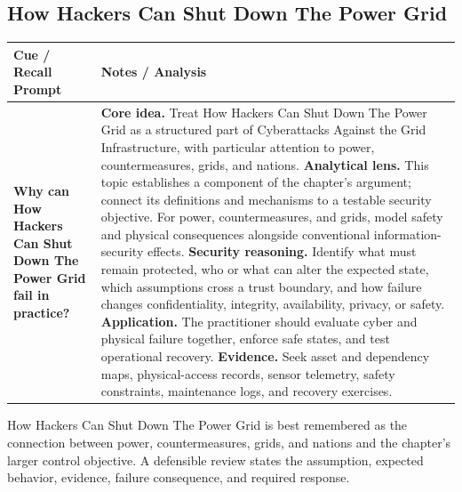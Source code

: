 \documentclass[11pt]{article}
\newcommand{\CornellHeader}{%
\rowcolor{Navy}\color{white}\bfseries Cue / Recall Prompt & \color{white}\bfseries Notes / Analysis\\\hline}
\newcommand{\CornellRow}[2]{%
\cellcolor{CueGray}\RaggedRight\textbf{#1} & \RaggedRight #2\\\hline}
\begin{document}
\subsection*{How Hackers Can Shut Down The Power Grid}
\begin{longtable}{>{\RaggedRight\arraybackslash}p{}|>{\RaggedRight\arraybackslash}p{}}
\CornellHeader
\CornellRow{Why can How Hackers Can Shut Down The Power Grid fail in practice?}{\textbf{Core idea.} Treat How Hackers Can Shut Down The Power Grid as a structured part of Cyberattacks Against the Grid Infrastructure, with particular attention to power, countermeasures, grids, and nations. \textbf{Analytical lens.} This topic establishes a component of the chapter's argument; connect its definitions and mechanisms to a testable security objective. For power, countermeasures, and grids, model safety and physical consequences alongside conventional information-security effects. \textbf{Security reasoning.} Identify what must remain protected, who or what can alter the expected state, which assumptions cross a trust boundary, and how failure changes confidentiality, integrity, availability, privacy, or safety. \textbf{Application.} The practitioner should evaluate cyber and physical failure together, enforce safe states, and test operational recovery. \textbf{Evidence.} Seek asset and dependency maps, physical-access records, sensor telemetry, safety constraints, maintenance logs, and recovery exercises.}
\end{longtable}
\begin{topicsummary}
How Hackers Can Shut Down The Power Grid is best remembered as the connection between power, countermeasures, grids, and nations and the chapter's larger control objective. A defensible review states the assumption, expected behavior, evidence, failure consequence, and required response.
\end{topicsummary}
\end{document}
